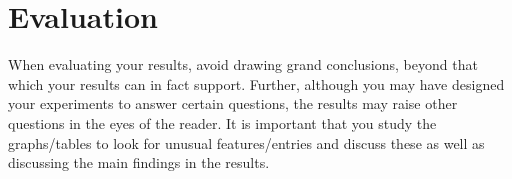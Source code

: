 \section{Evaluation}

When evaluating your results, avoid drawing grand conclusions, beyond that which your results can in fact support. Further, although you may have designed your experiments to answer certain questions, the results may raise other questions in the eyes of the reader. It is important that you study the graphs/tables to look for unusual features/entries and discuss these as well as discussing the main findings in the results. 











